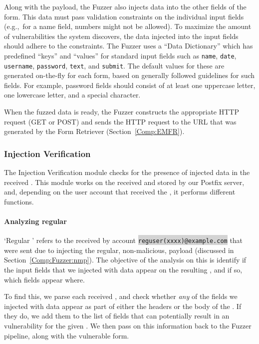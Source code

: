 Along with the payload, the Fuzzer also injects data into the other fields of the form. This data must pass validation constraints on the individual input fields (e.g.,\ for a name field, numbers might not be allowed). To maximize the amount of vulnerabilities the system discovers, the data injected into the input fields should adhere to the constraints. The Fuzzer uses a ``Data Dictionary'' which has predefined ``keys'' and ``values'' for standard input fields such as \texttt{name}, \texttt{date}, \texttt{username}, \texttt{password}, \texttt{text}, and \texttt{submit}.
The default values for these are generated on-the-fly for each form, based on generally followed guidelines for such fields. For example, password fields should consist of at least one uppercase letter, one lowercase letter, and a special character.

When the fuzzed data is ready, the Fuzzer constructs the appropriate HTTP request (GET or POST) and sends the HTTP request to the URL that was generated by the \Email Form Retriever (Section~\ref{Comp:EMFR}). 


\subsubsection{Injection Verification}
\label{Comp:EMA}
The Injection Verification module checks for the presence of injected data in the received \emails. This module works on the \emails received and stored by our Postfix server, and, depending on the user account that received the \email, it performs different functions.
\paragraph{Analyzing regular \email}
\sloppy
`Regular \email' refers to the \emails received by account \colorbox{lightgray}{\lstinline{reguser(xxxx)@example.com}} that were sent due to injecting the regular, non-malicious, payload (discussed in Section~\ref{Comp:Fuzzer:nmp}). The objective of the analysis on this \email is identify if the input fields that we injected with data appear on the resulting \email, and if so, which fields appear where.

To find this, we parse each received \email, and check whether \emph{any} of the fields we injected with data appear as part of either the headers or the body of the \email. If they do, we add them to the list of fields that can potentially result in an \ehi vulnerability for the given \email. We then pass on this information back to the Fuzzer pipeline, along with the vulnerable form.

